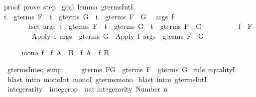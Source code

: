 \begin{isabellebody}
\begin{isamarkuptext}
proof\ {\isacharparenleft}prove{\isacharparenright}{\isacharcolon}\ step\ {}\isanewline
\isanewline
goal\ {\isacharparenleft}lemma\ gterms{\isacharunderscore}IntI{\isacharparenright}{\isacharcolon}\isanewline
t\ {\isasymin}\ gterms\ F\ {\isasymLongrightarrow}\ t\ {\isasymin}\ gterms\ G\ {\isasymlongrightarrow}\ t\ {\isasymin}\ gterms\ {\isacharparenleft}F\ {\isasyminter}\ G{\isacharparenright}\isanewline
\ {}{\isachardot}\ {\isasymAnd}args\ f{\isachardot}\isanewline
\ \ \ \ \ \ \ {\isasymlbrakk}{\isasymforall}t{\isasymin}set\ args{\isachardot}\ t\ {\isasymin}\ gterms\ F\ {\isasymand}\ {\isacharparenleft}t\ {\isasymin}\ gterms\ G\ {\isasymlongrightarrow}\ t\ {\isasymin}\ gterms\ {\isacharparenleft}F\ {\isasyminter}\ G{\isacharparenright}{\isacharparenright}{\isacharsemicolon}\isanewline
\ \ \ \ \ \ \ \ \ \ f\ {\isasymin}\ F{\isasymrbrakk}\isanewline
\ \ \ \ \ \ \ {\isasymLongrightarrow}\ Apply\ f\ args\ {\isasymin}\ gterms\ G\ {\isasymlongrightarrow}\ Apply\ f\ args\ {\isasymin}\ gterms\ {\isacharparenleft}F\ {\isasyminter}\ G{\isacharparenright}%
\end{isamarkuptext}%
%
\begin{isamarkuptext}%
\begin{isabelle}%
\ \ \ \ \ mono\ f\ {\isasymLongrightarrow}\ f\ {\isacharparenleft}A\ {\isasyminter}\ B{\isacharparenright}\ {\isasymsubseteq}\ f\ A\ {\isasyminter}\ f\ B%
\end{isabelle}
%
\end{isamarkuptext}%
\ gterms{\isacharunderscore}Int{\isacharunderscore}eq\ {\isacharbrackleft}simp{\isacharbrackright}{\isacharcolon}\isanewline
\ \ \ \ \ {\isachardoublequote}gterms\ {\isacharparenleft}F{\isasyminter}G{\isacharparenright}\ {\isacharequal}\ gterms\ F\ {\isasyminter}\ gterms\ G{\isachardoublequote}\isanewline
{}\ {\isacharparenleft}rule\ equalityI{\isacharparenright}\isanewline
{}\ {\isacharparenleft}blast\ intro{\isacharbang}{\isacharcolon}\ mono{\isacharunderscore}Int\ monoI\ gterms{\isacharunderscore}mono{\isacharparenright}\isanewline
{}\ {\isacharparenleft}blast\ intro{\isacharbang}{\isacharcolon}\ gterms{\isacharunderscore}IntI{\isacharparenright}\isanewline
{}\isanewline
\isanewline
\isanewline
{}\ integer{\isacharunderscore}arity\ {\isacharcolon}{\isacharcolon}\ {\isachardoublequote}integer{\isacharunderscore}op\ {\isasymRightarrow}\ nat{\isachardoublequote}\isanewline
{}\isanewline
{\isachardoublequote}integer{\isacharunderscore}arity\ {\isacharparenleft}Number\ n{\isacharparenright}\ \ \ \ \ \ \ \ {\isacharequal}\ {\isacharhash}{}{\isachardoublequote}\isanewline

\end{isabellebody}
